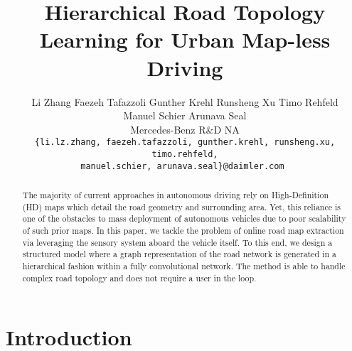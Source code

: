 \documentclass[10pt,twocolumn,letterpaper]{article}
\begin{document}
\title{Hierarchical Road Topology Learning for Urban Map-less Driving}

\author{Li Zhang \quad Faezeh Tafazzoli \quad Gunther Krehl \quad Runsheng Xu \quad Timo Rehfeld\\ Manuel Schier \quad Arunava Seal\\
Mercedes-Benz R\&D NA\\
\tt\small \{li.lz.zhang, faezeh.tafazzoli, gunther.krehl, runsheng.xu, timo.rehfeld,\\ 
\tt\small manuel.schier, arunava.seal\}@daimler.com
}
\maketitle
\ificcvfinal\thispagestyle{empty}\fi

\begin{abstract}
     The majority of current approaches in autonomous driving rely on High-Definition (HD) maps which detail the road geometry and surrounding area. Yet, this reliance is one of the obstacles to mass deployment of autonomous vehicles due to poor scalability of such prior maps. In this paper, we tackle the problem of online road map extraction via leveraging the sensory system aboard the vehicle itself. To this end, we design a structured model where a graph representation of the road network is generated in a hierarchical fashion within a fully convolutional network. The method is able to handle complex road topology and does not require a user in the loop.
\end{abstract}

\section{Introduction}
\end{document}
